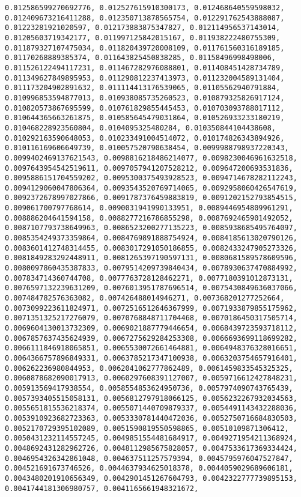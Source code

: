 \documentclass[11pt]{article}
\begin{document}
\begin{Verbatim}[commandchars=\\\{\}]
0.012586599270692776, 0.012527615910300173, 0.012468640559598032, 0.012409673216411288, 0.012350713878565754, 0.012291762543888087, 0.01223281921020597, 0.012173883875347827, 0.012114956537143014, 0.01205603719342177, 0.011997125842015167, 0.011938222480755309, 0.011879327107475034, 0.011820439720008109, 0.011761560316189185, 0.01170268889385374, 0.011643825450838285, 0.01158496998498006, 0.011526122494117231, 0.011467282976088801, 0.011408451428734789, 0.011349627849895953, 0.011290812237413973, 0.011232004589131404, 0.011173204902891632, 0.011114413176539065, 0.01105562940791884, 0.010996853594877013, 0.010938085735260523, 0.010879325826917124, 0.010820573867695599, 0.010761829855445453, 0.010703093788017112, 0.010644365663261875, 0.010585645479031864, 0.010526933233180219, 0.010468228923560804, 0.0104095325480284, 0.010350844104438608, 0.010292163590648053, 0.010233491004514072, 0.010174826343894926, 0.010116169606649739, 0.010057520790638454, 0.0099988798937220343, 0.0099402469137621543, 0.0098816218486214077, 0.0098230046961632518, 0.0097643954542519611, 0.0097057941207528212, 0.009647200693531836, 0.0095886151704559202, 0.0095300375493928523, 0.0094714678282112243, 0.0094129060047806364, 0.0093543520769714065, 0.0092958060426547619, 0.0092372678997027866, 0.0091787376459883819, 0.0091202152793854515, 0.009061700797768614, 0.0090031941990133951, 0.0089446954809961291, 0.008886204641594158, 0.0088277216786855298, 0.0087692465901492052, 0.0087107793738649963, 0.0086523200277135223, 0.0085938685495764097, 0.0085354249373359864, 0.0084769891888754924, 0.0084185613020790126, 0.0083601412748314455, 0.0083017291050186855, 0.0082433247905273326, 0.0081849283292448911, 0.0081265397190597131, 0.0080681589578609596, 0.0080097860435387833, 0.0079514209739840434, 0.0078930637470884992, 0.007834714360744708, 0.0077763728128462271, 0.0077180391012873131, 0.0076597132239631209, 0.0076013951787696514, 0.0075430849636037066, 0.007484782576363082, 0.007426488014946271, 0.007368201277252664, 0.0073099223611824971, 0.0072516512646367999, 0.0071933879855175962, 0.0071351325217276079, 0.0070768848711704468, 0.0070186450317505714, 0.0069604130013732309, 0.0069021887779446654, 0.0068439723593718112, 0.0067857637435624939, 0.0067275629284253308, 0.0066693699118699282, 0.0066111846918065851, 0.0065530072661464881, 0.0064948376328016651, 0.0064366757896849331, 0.0063785217347100938, 0.0063203754657916401, 0.006262236980844953, 0.0062041062777862489, 0.0061459833545325325, 0.0060878682090017913, 0.0060297608391127007, 0.0059716612427848231, 0.005913569417938554, 0.0058554853624950736, 0.0057974090743765439, 0.0057393405515058131, 0.0056812797918066125, 0.0056232267932034563, 0.0055651815536218374, 0.0055071440709879337, 0.0054491143432288036, 0.0053910923682723363, 0.0053330781440472036, 0.0052750716684830503, 0.0052170729395102089, 0.0051590819550598865, 0.00510109871306412, 0.0050431232114557245, 0.0049851554481684917, 0.0049271954211368924, 0.0048692431282962726, 0.0048112985675828057, 0.0047533617369334424, 0.0046954326342861048, 0.004637511257579394, 0.0045795976047527847, 0.004521691673746526, 0.0044637934625018378, 0.0044059029689606181, 0.0043480201910656349, 0.0042901451267604793, 0.0042322777739895153, 0.0041744181306980757, 0.0041165661948321672, 
\end{Verbatim}
\end{document}
